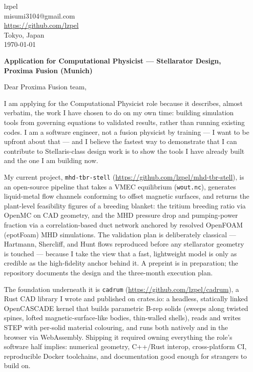 \documentclass[11pt]{article}
\begin{document}
\begin{flushright}
lzpel \\
misumi3104@gmail.com \\
\url{https://github.com/lzpel} \\
Tokyo, Japan \\
\today
\end{flushright}

\textbf{Application for Computational Physicist --- Stellarator Design, Proxima Fusion (Munich)}

Dear Proxima Fusion team,

I am applying for the Computational Physicist role because it describes, almost
verbatim, the work I have chosen to do on my own time: building simulation tools
from governing equations to validated results, rather than running existing codes.
I am a software engineer, not a fusion physicist by training --- I want to be
upfront about that --- and I believe the fastest way to demonstrate that I can
contribute to Stellaris-class design work is to show the tools I have already
built and the one I am building now.

My current project, \texttt{mhd-tbr-stell}
(\url{https://github.com/lzpel/mhd-tbr-stell}), is an open-source pipeline that
takes a VMEC equilibrium (\texttt{wout.nc}), generates liquid-metal flow channels
conforming to offset magnetic surfaces, and returns the plant-level feasibility
figures of a breeding blanket: the tritium breeding ratio via OpenMC on CAD
geometry, and the MHD pressure drop and pumping-power fraction via a
correlation-based duct network anchored by resolved OpenFOAM (epotFoam) MHD
simulations. The validation plan is deliberately classical --- Hartmann, Shercliff,
and Hunt flows reproduced before any stellarator geometry is touched --- because I
take the view that a fast, lightweight model is only as credible as the
high-fidelity anchor behind it. A preprint is in preparation; the repository
documents the design and the three-month execution plan.

The foundation underneath it is \texttt{cadrum}
(\url{https://github.com/lzpel/cadrum}), a Rust CAD library I wrote and published
on crates.io: a headless, statically linked OpenCASCADE kernel that builds
parametric B-rep solids (sweeps along twisted spines, lofted magnetic-surface-like
bodies, thin-walled shells), reads and writes STEP with per-solid material
colouring, and runs both natively and in the browser via WebAssembly. Shipping it
required owning everything the role's software half implies: numerical geometry,
C++/Rust interop, cross-platform CI, reproducible Docker toolchains, and
documentation good enough for strangers to build on.
\end{document}
